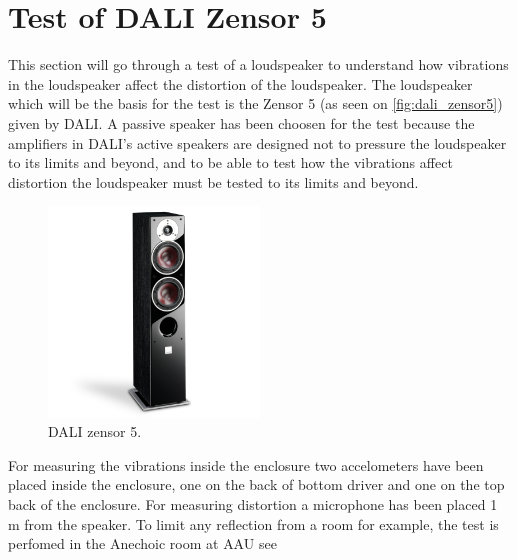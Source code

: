 \section{Test of DALI Zensor 5}
This section will go through a test of a loudspeaker to understand how vibrations in the loudspeaker affect the distortion of the loudspeaker.
The loudspeaker which will be the basis for the test is the Zensor 5 (as seen on \autoref{fig:dali_zensor5}) given by DALI. A passive speaker has been choosen for the test because the amplifiers in DALI's active speakers are designed not to pressure the loudspeaker to its limits and beyond, and to be able to test how the vibrations affect distortion the loudspeaker must be tested to its limits and beyond.

\begin{figure}[H]
\centering
\includegraphics[width=0.5\textwidth]{figures/zensor5.png}
\caption{DALI zensor 5.}
\label{fig:dali_zensor5}
\end{figure}


For measuring the vibrations inside the enclosure two accelometers have been placed inside the enclosure, one on the back of bottom driver and one on the top back of the enclosure. For measuring distortion a microphone has been placed 1 m from the speaker. To limit any reflection from a room for example, the test is perfomed in the Anechoic room at \gls{AAU} see   

